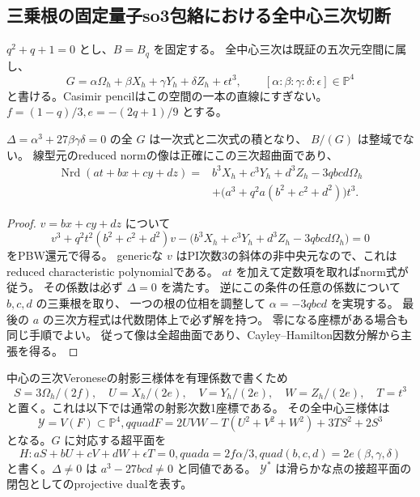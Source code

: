 \subsection{三乗根の固定量子so3包絡における全中心三次切断}
\label{subsec:quantum-triangle-full-cuts}
$q^2+q+1=0$ とし、$B=B_q$ を固定する。
全中心三次は既証の五次元空間に属し、
\[
 G=\alpha\Omega_h+\beta X_h+\gamma Y_h+\delta Z_h+\epsilon t^3,
 \qquad [\alpha:\beta:\gamma:\delta:\epsilon]\in\mathbb P^4
\]
と書ける。Casimir pencilはこの空間の一本の直線にすぎない。
$f=(1-q)/3,e=-(2q+1)/9$ とする。

\begin{lemma}[全因数分解切断とnorm超曲面]
\label{lem:quantum-triangle-norm-hypersurface}
$\Delta=\alpha^3+27\beta\gamma\delta=0$ の全 $G$ は一次式と二次式の積となり、
$B/(G)$ は整域でない。
線型元のreduced normの像は正確にこの三次超曲面であり、
\[
 \begin{aligned}
 \operatorname{Nrd}(at+bx+cy+dz)
  ={}&b^3X_h+c^3Y_h+d^3Z_h-3qbcd\Omega_h\\
    &+\bigl(a^3+q^2a(b^2+c^2+d^2)\bigr)t^3.
 \end{aligned}
\]
\end{lemma}
\begin{proof}
$v=bx+cy+dz$ について
\[
 v^3+q^2t^2(b^2+c^2+d^2)v
   -\bigl(b^3X_h+c^3Y_h+d^3Z_h-3qbcd\Omega_h\bigr)=0
\]
をPBW還元で得る。
genericな $v$ はPI次数3の斜体の非中央元なので、これはreduced characteristic polynomialである。
$at$ を加えて定数項を取ればnorm式が従う。
その係数は必ず $\Delta=0$ を満たす。
逆にこの条件の任意の係数について $b,c,d$ の三乗根を取り、
一つの根の位相を調整して $\alpha=-3qbcd$ を実現する。
最後の $a$ の三次方程式は代数閉体上で必ず解を持つ。
零になる座標がある場合も同じ手順でよい。
従って像は全超曲面であり、Cayley--Hamilton因数分解から主張を得る。
\end{proof}

中心の三次Veroneseの射影三様体を有理係数で書くため
\[
 S=3\Omega_h/(2f),\quad U=X_h/(2e),\quad V=Y_h/(2e),\quad
 W=Z_h/(2e),\quad T=t^3
\]
と置く。これは以下では通常の射影次数1座標である。
その全中心三様体は
\[
 \mathcal Y=V(F)\subset\mathbb P^4,qquad
 F=2UVW-T(U^2+V^2+W^2)+3TS^2+2S^3
\]
となる。$G$ に対応する超平面を
\[
 H:aS+bU+cV+dW+\epsilon T=0,quad
 a=2f\alpha/3,quad(b,c,d)=2e(\beta,\gamma,\delta)
\]
と書く。$\Delta\ne0$ は $a^3-27bcd\ne0$ と同値である。
$\mathcal Y^*$ は滑らかな点の接超平面の閉包としてのprojective dualを表す。

